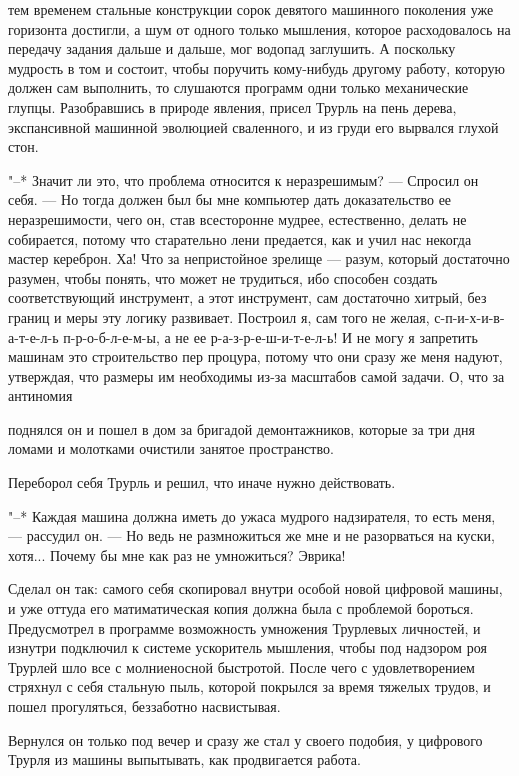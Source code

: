 тем временем стальные конструкции сорок девятого
машинного поколения уже горизонта достигли, а шум от одного
только мышления, которое расходовалось на передачу задания
дальше и дальше, мог водопад заглушить. А поскольку мудрость
в том и состоит, чтобы поручить кому-нибудь другому работу,
которую должен сам выполнить, то слушаются программ одни
только механические глупцы. Разобравшись в природе явления,
присел Трурль на пень дерева, экспансивной машинной
эволюцией сваленного, и из груди его вырвался глухой стон.

"--* Значит ли это, что проблема относится к неразрешимым? --- Спросил
он себя. --- Но тогда должен был бы мне компьютер
дать доказательство ее неразрешимости, чего он, став
всесторонне мудрее, естественно, делать не собирается,
потому что старательно лени предается, как и учил нас
некогда мастер кереброн. Ха! Что за непристойное зрелище --- разум,
который достаточно разумен, чтобы понять, что может
не трудиться, ибо способен создать соответствующий
инструмент, а этот инструмент, сам достаточно хитрый, без
границ и меры эту логику развивает. Построил я, сам того не
желая, с-п-и-х-и-в-а-т-е-л-ь п-р-о-б-л-е-м-ы, а не ее
р-а-з-р-е-ш-и-т-е-л-ь! И не могу я запретить машинам это
строительство пер процура, потому что они сразу же меня
надуют, утверждая, что размеры им необходимы из-за масштабов
самой задачи. О, что за антиномия

поднялся он и пошел в дом за бригадой демонтажников,
которые за три дня ломами и молотками очистили занятое
пространство.

Переборол себя Трурль и решил, что иначе нужно
действовать.

"--* Каждая машина должна иметь до ужаса мудрого
надзирателя, то есть меня, --- рассудил он. --- Но ведь не
размножиться же мне и не разорваться на куски, хотя...
Почему бы мне как раз не умножиться? Эврика!

Сделал он так: самого себя скопировал внутри особой новой
цифровой машины, и уже оттуда его матиматическая копия
должна была с проблемой бороться. Предусмотрел в программе
возможность умножения Трурлевых личностей, и изнутри
подключил к системе ускоритель мышления, чтобы под надзором
роя Трурлей шло все с молниеносной быстротой. После чего с
удовлетворением стряхнул с себя стальную пыль, которой
покрылся за время тяжелых трудов, и пошел прогуляться,
беззаботно насвистывая.

Вернулся он только под вечер и сразу же стал у своего
подобия, у цифрового Трурля из машины выпытывать, как
продвигается работа.

